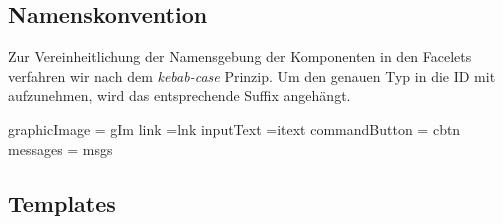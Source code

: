 \newcommand{\ftable}[1]{\begin{sidewaystable}
\begin{tabular}[H]{ |m{2cm}| m{3cm}| m{4cm}| m{6cm} |m{4cm}| m{2cm}| }
    \toprule
    \textbf{ID} & \textbf{Typ} & \textbf{Beschreibung} & \textbf{Binding} & \textbf{Constraints} & \textbf{Validator \newline Converter} \\
    \midrule
    #1
\end{tabular}
\end{sidewaystable}
}

\newcommand{\fentry}[6]{#1 & #2 & #3 & #4 & #5 & #6\\\hline}


\subsection{Namenskonvention}

Zur Vereinheitlichung der Namensgebung der Komponenten in den Facelets verfahren wir nach dem \emph{kebab-case} Prinzip. Um den genauen Typ in die ID mit aufzunehmen, wird das entsprechende Suffix angehängt.

 graphicImage = gIm link =lnk inputText =itext commandButton = cbtn messages = msgs

\subsection{Templates}

